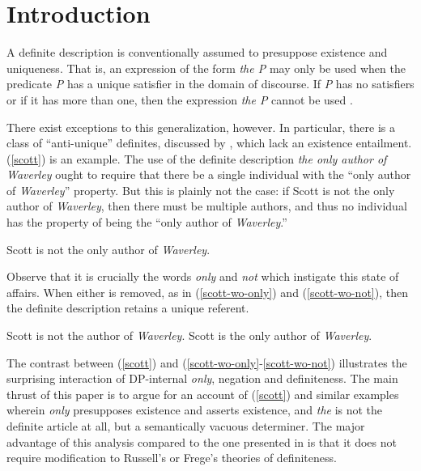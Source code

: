 \section{Introduction \label{sec:intro}}
A definite description is conventionally assumed to presuppose existence and uniqueness. That is, an expression of the form \textit{the P} may only be used when the predicate \textit{P} has a unique satisfier in the domain of discourse. If \textit{P} has no satisfiers or if it has more than one, then the expression \textit{the P} cannot be used \citep{frege, russell, horn-abbott-2012}.

There exist exceptions to this generalization, however. In particular, there is a class of ``anti-unique'' definites, discussed by \citet{cb2015}, which lack an existence entailment. (\ref{scott}) is an example. The use of the definite description \textit{the only author of Waverley} ought to require that there be a single individual with the ``only author of \textit{Waverley}'' property. But this is plainly not the case: if Scott is not the only author of \textit{Waverley}, then there must be multiple authors, and thus no individual has the property of being the ``only author of \textit{Waverley}.''

\begin{exe}
	\ex \label{scott} Scott is not the only author of \textit{Waverley}.
\end{exe}

Observe that it is crucially the words \textit{only} and \textit{not} which instigate this state of affairs. When either is removed, as in (\ref{scott-wo-only}) and (\ref{scott-wo-not}), then the definite description retains a unique referent.

\begin{exe}
	\ex \label{scott-wo-only} Scott is not the author of \textit{Waverley}.
	\ex \label{scott-wo-not} Scott is the only author of \textit{Waverley}.
\end{exe}

The contrast between (\ref{scott}) and (\ref{scott-wo-only}-\ref{scott-wo-not}) illustrates the surprising interaction of DP-internal \textit{only}, negation and definiteness. The main thrust of this paper is to argue for an account of (\ref{scott}) and similar examples wherein \textit{only} presupposes existence and asserts existence, and \textit{the} is not the definite article at all, but a semantically vacuous determiner. The major advantage of this analysis compared to the one presented in \citet{cb2015} is that it does not require modification to Russell's or Frege's theories of definiteness.

